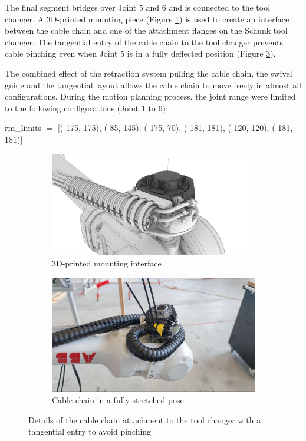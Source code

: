 The final segment bridges over Joint 5 and 6 and is connected to the tool changer. A 3D-printed mounting piece (Figure \ref{fig:3d-printed-mounting-piece}) is used to create an interface between the cable chain and one of the attachment flanges on the Schunk tool changer. The tangential entry of the cable chain to the tool changer prevents cable pinching even when Joint 5 is in a fully deflected position (Figure \ref{fig:cable-chain-in-stretched-pose}). 

The combined effect of the retraction system pulling the cable chain, the swivel guide and the tangential layout allows the cable chain to move freely in almost all configurations. During the motion planning process, the joint range were limited to the following configurations (Joint 1 to 6):

{\footnotesize rm\_limits $=$ [(-175, 175), (-85, 145), (-175, 70), (-181, 181), (-120, 120), (-181, 181)]}

\begin{figure}[!h]
    \centering
    \begin{subfigure}[b]{0.49\textwidth}
        \centering
        \includegraphics[width=\textwidth]{images/6a/img07.jpg}
        \caption{3D-printed mounting interface}
        \label{fig:3d-printed-mounting-piece}
    \end{subfigure}
    \begin{subfigure}[b]{0.49\textwidth}
        \centering
        \includegraphics[width=\textwidth]{images/6a/img08.jpg}
        \caption{Cable chain in a fully stretched pose}
        \label{fig:cable-chain-in-stretched-pose}
    \end{subfigure}
    \hfill
    \caption{Details of the cable chain attachment to the tool changer with a tangential entry to avoid pinching}
\end{figure}



